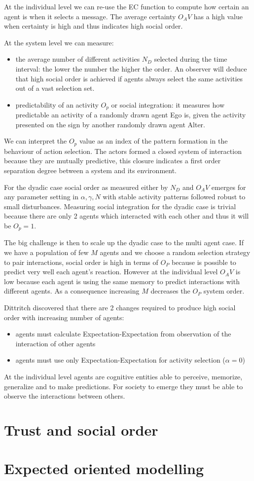 \documentclass[a4paper,10pt]{article}
\begin{document}
At the individual level we can re-use the EC function to compute how certain an agent is when it selects a message. 
The average certainty $O_AV$ has a high value when certainty is high and thus indicates high social order.

At the system level we can measure:
\begin{itemize}
 \item the average number of different activities $N_D$ selected during the time interval: the lower the number the higher the order. An observer will deduce that high social order is achieved if agents always select the same activities out of a vast selection set.
 \item predictability of an activity $O_p$ or social integration: it measures how predictable an activity of a randomly drawn agent Ego is, given the activity presented on the sign by another randomly drawn agent Alter.
\end{itemize}

We can interpret the $O_p$ value as an index of the pattern formation in the behaviour of action selection. The actors formed a closed system of interaction because they are mutually predictive, this closure indicates a first order separation degree between a system and its environment.

For the dyadic case social order as measured either by $N_D$ and $O_AV$ emerges for any parameter setting in $\alpha,\gamma, N$ with stable activity patterns followed robust to small disturbances.
Measuring social integration for the dyadic case is trivial because there are only 2 agents which interacted with each other and thus it will be $O_p=1$.

The big challenge is then to scale up the dyadic case to the multi agent case.
If we have a population of few $M$ agents and we choose a random selection strategy to pair interactions, 
social order is high in terms of $O_P$ because is possible to predict very well each agent's reaction.
However at the individual level $O_AV$ is low because each agent is using the same memory to predict interactions with different agents. As a consequence increasing $M$ decreases the $O_P$ system order.

Dittritch discovered that there are 2 changes required to produce high social order with increasing number of agents:
\begin{itemize}
 \item agents must calculate Expectation-Expectation from observation of the interaction of other agents
 \item agents must use only Expectation-Expectation for activity selection ($\alpha=0$)
\end{itemize}

At the individual level agents are cognitive entities able to perceive, memorize, generalize and to make predictions.
For society to emerge they must be able to observe the interactions between others. 

\section{Trust and social order}

\section{Expected oriented modelling}
\end{document}
